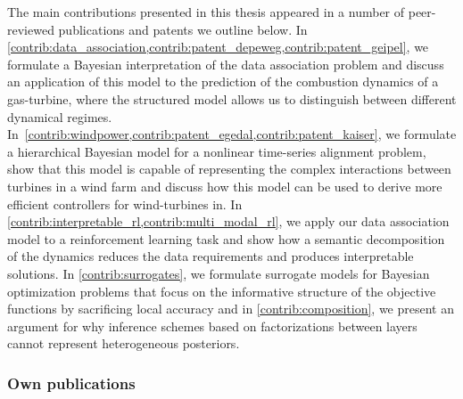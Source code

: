 The main contributions presented in this thesis appeared in a number of peer-reviewed publications and patents we outline below.
In \cref{contrib:data_association,contrib:patent_depeweg,contrib:patent_geipel}, we formulate a Bayesian interpretation of the data association problem and discuss an application of this model to the prediction of the combustion dynamics of a gas-turbine, where the structured model allows us to distinguish between different dynamical regimes.
In~\cref{contrib:windpower,contrib:patent_egedal,contrib:patent_kaiser}, we formulate a hierarchical Bayesian model for a nonlinear time-series alignment problem, show that this model is capable of representing the complex interactions between turbines in a wind farm and discuss how this model can be used to derive more efficient controllers for wind-turbines in.
In \cref{contrib:interpretable_rl,contrib:multi_modal_rl}, we apply our data association model to a reinforcement learning task and show how a semantic decomposition of the dynamics reduces the data requirements and produces interpretable solutions.
In \cref{contrib:surrogates}, we formulate surrogate models for Bayesian optimization problems that focus on the informative structure of the objective functions by sacrificing local accuracy and in \cref{contrib:composition}, we present an argument for why inference schemes based on factorizations between layers cannot represent heterogeneous posteriors.


\subsubsection{Own publications}

